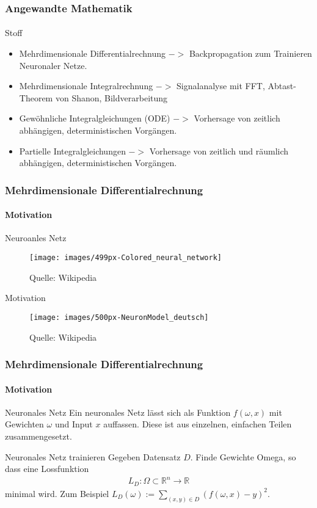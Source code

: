 \documentclass{beamer}
\begin{document}
\begin{frame}
    \frametitle{Angewandte Mathematik}
\framesubtitle{}
    \begin{block}{Stoff}
\begin{itemize}
\pause \item Mehrdimensionale Differentialrechnung $->$ Backpropagation zum Trainieren Neuronaler Netze.
\pause \item Mehrdimensionale Integralrechnung $->$ Signalanalyse mit FFT, Abtast-Theorem von Shanon, Bildverarbeitung
\pause \item Gewöhnliche Integralgleichungen (ODE) $->$ Vorhersage von zeitlich abhängigen, deterministischen Vorgängen.
\pause \item Partielle Integralgleichungen $->$ Vorhersage von zeitlich und räumlich abhängigen, deterministischen Vorgängen.
\end{itemize}
\end{block}

 \end{frame}


\begin{frame}
    \frametitle{Mehrdimensionale Differentialrechnung}
\framesubtitle{Motivation}
    \begin{block}{Neuroanles Netz}
\begin{figure}[htp]
    \texttt{[image: images/499px-Colored\_neural\_network]}
      \caption{Quelle: Wikipedia}
\end{figure}
\end{block}
    \begin{block}{Motivation}
\begin{figure}[htp]
    \texttt{[image: images/500px-NeuronModel\_deutsch]}
      \caption{Quelle: Wikipedia}
\end{figure}
\end{block}
 \end{frame}

\begin{frame}
    \frametitle{Mehrdimensionale Differentialrechnung}
\framesubtitle{Motivation}
    \begin{block}{Neuronales Netz}
Ein  neuronales Netz lässt sich als Funktion $f(\omega, x)$ mit Gewichten $\omega$ und Input $x$ auffassen.
Diese  ist aus einzelnen, einfachen Teilen zusammengesetzt.
\end{block}

{
    \begin{block}{Neuronales Netz trainieren}
Gegeben Datensatz $D$. Finde Gewichte Omega, so dass eine Lossfunktion
\begin{align*}
L_D  : \Omega \subset \mathbb{R}^n \to \mathbb{R} 
\end{align*}
minimal wird. Zum Beispiel $L_D(\omega) := \sum_{(x,y) \in D} (f(\omega, x) - y)^2$.
\end{block}
}
 \end{frame}
\end{document}
